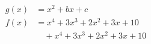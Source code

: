 \documentclass[UTF8]{article}
\begin{document}
 
\begin{align*}
\begin{split}
    g(x) &= x^2 + bx + c \\
    f(x) &= x^4 + 3x^3 + 2x^2 + 3x + 10 \\
    &\quad + x^4 + 3x^3 + 2x^2 + 3x + 10
\end{split}
\end{align*}
\end{document}

